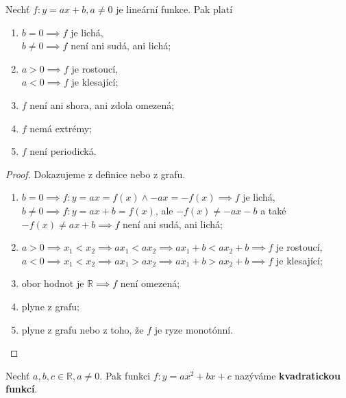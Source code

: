 \begin{veta}
  Nechť $f\colon y = ax + b, a \neq 0$ je lineární funkce. Pak platí
  \begin{enumerate}[$i.$]
    \item $b=0 \implies f$ je lichá,\\
          $b \neq 0 \implies f$ není ani sudá, ani lichá;
    \item $a > 0 \implies f$ je rostoucí,\\
          $a < 0 \implies f$ je klesající;
    \item $f$ není ani shora, ani zdola omezená;
    \item $f$ nemá extrémy;
    \item $f$ není periodická.
  \end{enumerate}
\end{veta}

\begin{proof}
Dokazujeme z definice nebo z grafu.
  \begin{enumerate}[$i.$]
    \item $b=0 \implies f\colon y= ax = f(x) \land -ax = -f(x) \implies f$ je lichá,\\
          $b\neq 0 \implies f\colon y = ax + b = f(x)$, ale $-f(x)\neq -ax - b$ a také $-f(x) \neq ax + b \implies f$ není ani sudá, ani lichá;
    \item $a>0 \implies x_1 < x_2 \implies ax_1 < ax_2 \implies ax_1 + b < ax_2 + b \implies f$ je rostoucí,\\
          $a<0 \implies x_1 < x_2 \implies ax_1 > ax_2 \implies ax_1 + b > ax_2 + b \implies f$ je klesající;
    \item obor hodnot je $\mathbb R \implies f$ není omezená;
    \item plyne z grafu;
    \item plyne z grafu nebo z toho, že $f$ je ryze monotónní. \qedhere
  \end{enumerate}
\end{proof}

\begin{definition}
  Nechť $a,b,c \in \mathbb R, a \neq 0$. Pak funkci $f\colon y = ax^2 + bx+ c$ nazýváme \textbf{kvadratickou funkcí}.
\end{definition}

